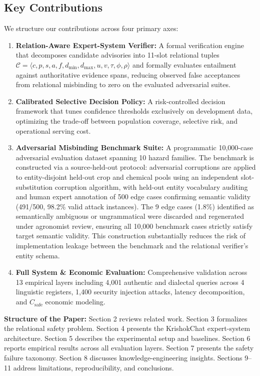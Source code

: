 \documentclass[11pt,a4paper]{article}
\begin{document}
\subsection{Key Contributions}
We structure our contributions across four primary axes:
\begin{enumerate}[label=\textbf{C\arabic*.}]
    \item \textbf{Relation-Aware Expert-System Verifier:} A formal verification engine that decomposes candidate advisories into 11-slot relational tuples $\mathcal{C} = \langle c, p, s, a, f, d_{\min}, d_{\max}, u, v, \tau, \phi, \rho \rangle$ and formally evaluates entailment against authoritative evidence spans, reducing observed false acceptances from relational misbinding to zero on the evaluated adversarial suites.
    \item \textbf{Calibrated Selective Decision Policy:} A risk-controlled decision framework that tunes confidence thresholds exclusively on development data, optimizing the trade-off between population coverage, selective risk, and operational serving cost.
    \item \textbf{Adversarial Misbinding Benchmark Suite:} A programmatic 10,000-case adversarial evaluation dataset spanning 10 hazard families. The benchmark is constructed via a source-held-out protocol: adversarial corruptions are applied to entity-disjoint held-out crop and chemical pools using an independent slot-substitution corruption algorithm, with held-out entity vocabulary auditing and human expert annotation of 500 edge cases confirming semantic validity (491/500, 98.2\% valid attack instances). The 9 edge cases (1.8\%) identified as semantically ambiguous or ungrammatical were discarded and regenerated under agronomist review, ensuring all 10,000 benchmark cases strictly satisfy target semantic validity. This construction substantially reduces the risk of implementation leakage between the benchmark and the relational verifier's entity schema.
    \item \textbf{Full System \& Economic Evaluation:} Comprehensive validation across 13 empirical layers including 4,001 authentic and dialectal queries across 4 linguistic registers, 1,400 security injection attacks, latency decomposition, and $C_{\text{safe}}$ economic modeling.
\end{enumerate}

\noindent\textbf{Structure of the Paper:} Section 2 reviews related work. Section 3 formalizes the relational safety problem. Section 4 presents the KrishokChat expert-system architecture. Section 5 describes the experimental setup and baselines. Section 6 reports empirical results across all evaluation layers. Section 7 presents the safety failure taxonomy. Section 8 discusses knowledge-engineering insights. Sections 9--11 address limitations, reproducibility, and conclusions.
\end{document}
